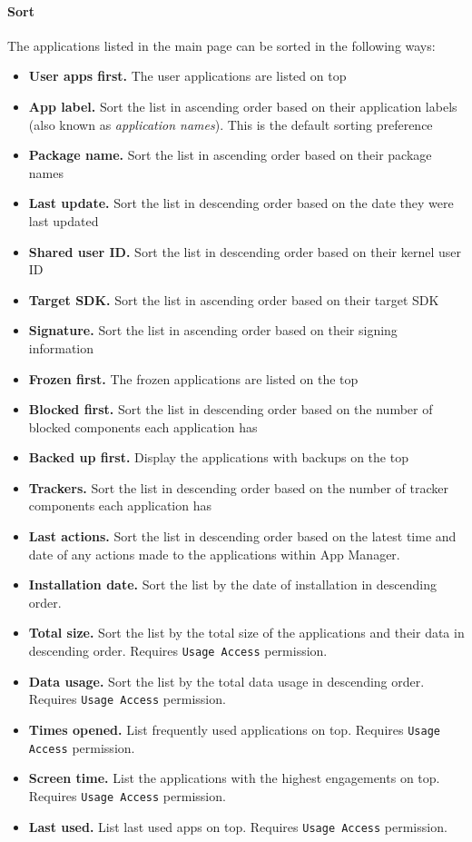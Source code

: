 \paragraph{Sort}\hypertarget{par:main-page-sort}{} %
The applications listed in the main page can be sorted in the following ways:
\begin{itemize}
    \item \textbf{User apps first.} The user applications are listed on top
    \item \textbf{App label.} Sort the list in ascending order based on their application labels (also known as
    \textit{application names}). This is the default sorting preference
    \item \textbf{Package name.} Sort the list in ascending order based on their package names
    \item \textbf{Last update.} Sort the list in descending order based on the date they were last updated
    \item \textbf{Shared user ID.} Sort the list in descending order based on their kernel user ID
    \item \textbf{Target SDK.} Sort the list in ascending order based on their target SDK
    \item \textbf{Signature.} Sort the list in ascending order based on their signing information
    \item \textbf{Frozen first.} The frozen applications are listed on the top
    \item \textbf{Blocked first.} Sort the list in descending order based on the number of blocked components each
    application has
    \item \textbf{Backed up first.} Display the applications with backups on the top
    \item \textbf{Trackers.} Sort the list in descending order based on the number of tracker components each
    application has
    \item \textbf{Last actions.} Sort the list in descending order based on the latest time and date of any actions made
    to the applications within App Manager.
    \item \textbf{Installation date.} Sort the list by the date of installation in descending order.
    \item \textbf{Total size.} Sort the list by the total size of the applications and their data in descending order. Requires \texttt{Usage Access} permission.
    \item \textbf{Data usage.} Sort the list by the total data usage in descending order. Requires \texttt{Usage Access} permission.
    \item \textbf{Times opened.} List frequently used applications on top. Requires \texttt{Usage Access} permission.
    \item \textbf{Screen time.} List the applications with the highest engagements on top. Requires \texttt{Usage Access} permission.
    \item \textbf{Last used.} List last used apps on top. Requires \texttt{Usage Access} permission.
\end{itemize}

